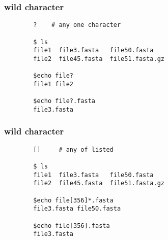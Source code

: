 \documentclass[xcolor=dvipsnames]{beamer}
\begin{document}
\begin{frame}[fragile]
	\frametitle{wild character}
	\large
	\begin{verbatim}
		?    # any one character

		$ ls
		file1  file3.fasta   file50.fasta
		file2  file45.fasta  file51.fasta.gz

		$echo file?
		file1 file2

		$echo file?.fasta
		file3.fasta
	\end{verbatim}
\end{frame}

\begin{frame}[fragile]
	\frametitle{wild character}
	\large
	\begin{verbatim}
		[]     # any of listed

		$ ls
		file1  file3.fasta   file50.fasta
		file2  file45.fasta  file51.fasta.gz

		$echo file[356]*.fasta
		file3.fasta file50.fasta

		$echo file[356].fasta
		file3.fasta
	\end{verbatim}
\end{frame}
\end{document}
